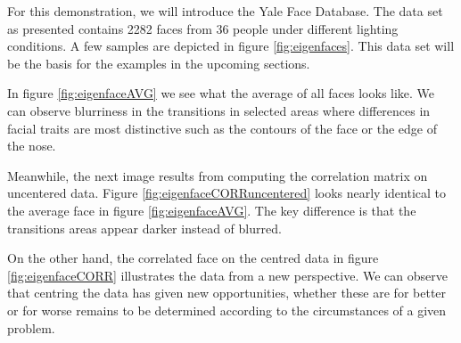 \begin{minipage}[h][120mm][t]{0.55\linewidth}

    \setlength{\parindent}{2em}

    \bigskip

    \noindent
    For this demonstration, we will introduce the Yale Face Database.
    The data set as presented contains 2282 faces from 36 people under different lighting conditions.
    A few samples are depicted in figure \ref{fig:eigenfaces}.
    This data set will be the basis for the examples in the upcoming sections.

    \bigskip

    In figure \ref{fig:eigenfaceAVG} we see what the average of all faces looks like.
    We can observe blurriness in the transitions in selected areas where differences in facial traits are most distinctive such as the contours of the face or the edge of the nose.

    \medskip

    Meanwhile, the next image results from computing the correlation matrix on uncentered data.
    Figure \ref{fig:eigenfaceCORRuncentered} looks nearly identical to the average face in figure \ref{fig:eigenfaceAVG}.
    The key difference is that the transitions areas appear darker instead of blurred.

    \medskip

    On the other hand, the correlated face on the centred data in figure \ref{fig:eigenfaceCORR} illustrates the data from a new perspective.
    We can observe that centring the data has given new opportunities, whether these are for better or for worse remains to be determined according to the circumstances of a given problem.


\end{minipage}%
